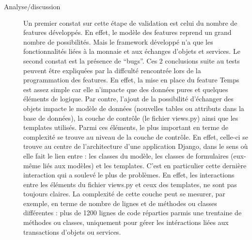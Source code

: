 \begin{description}
\item[Analyse/discussion] Un premier constat sur cette étape de validation est celui du nombre de features développés.  En effet,  le modèle des features reprend un grand nombre de possibilités.  Mais le framework développé n'a que les fonctionnalités liées à la monnaie et aux échanges d'objets et services.   Le second constat est la présence de ``bugs''.  Ces 2 conclusions suite au tests peuvent être expliquées par la diffculté rencontrée lors de la programmation des features.  En effet,  la mise en place du feature Temps est assez simple car elle n'impacte que des données pures et quelques éléments de logique.  Par contre,  l'ajout de la possibilité d'échanger des objets impacte le modèle de données (nouvelles tables ou attributs dans la base de données),  la couche de contrôle (le fichier views.py) ainsi que les templates utilisés.  Parmi ces éléments,  le plus important en terme de complexité se trouve au niveau de la couche de contrôle.  En effet,  celle-ci se trouve au centre de l'architecture d'une application Django,  dans le sens où elle fait le lien entre : les classes du modèle,  les classes de formulaires (eux-même liés aux modèles) et les templates.  C'est en particulier cette dernière interaction qui a soulevé le plus de problèmes.  En effet,  les interactions entre les éléments du fichier views.py et ceux des templates,  ne sont pas toujours claires.  La complexité de cette couche peut se mesurer,  par exemple,  en terme de nombre de lignes et de méthodes ou classes différentes : plus de 1200 lignes de code réparties parmis une trentaine de méthodes ou classes,  uniquement pour gérer les intéractions liées aux transactions d'objets ou services.


\end{description}